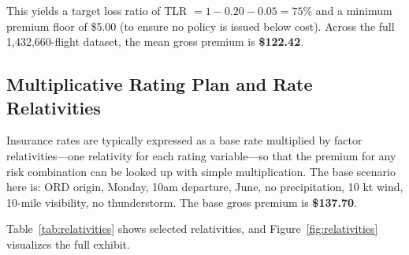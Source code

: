 \documentclass[12pt, a4paper]{article}
\begin{document}
\noindent This yields a target loss ratio of TLR $= 1 - 0.20 - 0.05 = 75\%$ and a minimum premium floor of \$5.00 (to ensure no policy is issued below cost). Across the full 1,432,660-flight dataset, the mean gross premium is \textbf{\$122.42}.

\subsection{Multiplicative Rating Plan and Rate Relativities}

Insurance rates are typically expressed as a base rate multiplied by factor relativities---one relativity for each rating variable---so that the premium for any risk combination can be looked up with simple multiplication. The base scenario here is: ORD origin, Monday, 10am departure, June, no precipitation, 10 kt wind, 10-mile visibility, no thunderstorm. The base gross premium is \textbf{\$137.70}.

Table~\ref{tab:relativities} shows selected relativities, and Figure~\ref{fig:relativities} visualizes the full exhibit.
\end{document}
